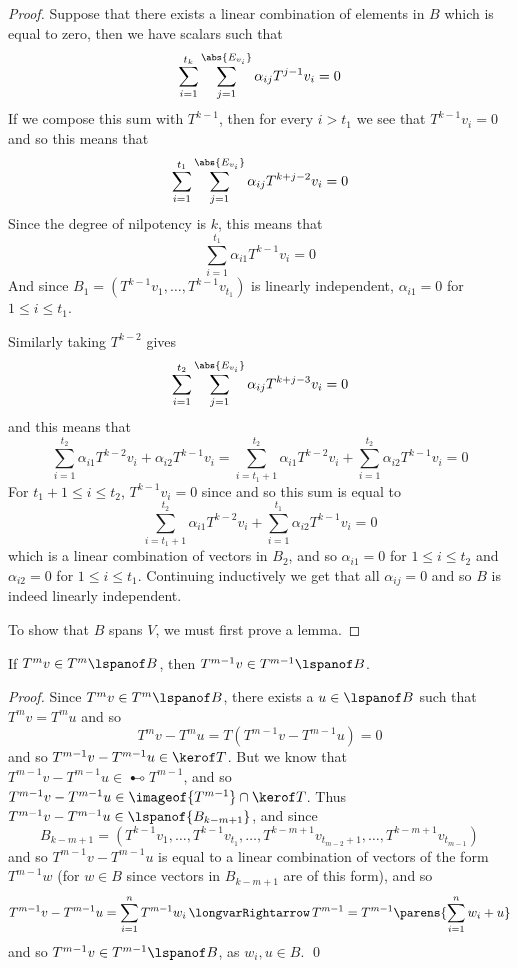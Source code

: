 \begin{proof}
    Suppose that there exists a linear combination of elements in $B$ which is equal to zero, then we have scalars such that
    \[ \sum_{i=1}^{t_k}\sum_{j=1}^{\abs{E_{v_i}}}\alpha_{ij}T^{j-1}v_i = 0 \]
    If we compose this sum with $T^{k-1}$, then for every $i>t_1$ we see that $T^{k-1}v_i=0$ and so this means that
    \[ \sum_{i=1}^{t_1}\sum_{j=1}^{\abs{E_{v_i}}}\alpha_{ij}T^{k+j-2}v_i = 0 \]
    Since the degree of nilpotency is $k$, this means that
    \[ \sum_{i=1}^{t_1}\alpha_{i1}T^{k-1}v_i = 0 \]
    And since $B_1=(T^{k-1}v_1,\dots,T^{k-1}v_{t_1})$ is linearly independent, $\alpha_{i1}=0$ for $1\leq i\leq t_1$.

    Similarly taking $T^{k-2}$ gives
    \[ \sum_{i=1}^{t_2}\sum_{j=1}^{\abs{E_{v_i}}}\alpha_{ij}T^{k+j-3}v_i = 0 \]
    and this means that
    \[ \sum_{i=1}^{t_2}\alpha_{i1}T^{k-2}v_i + \alpha_{i2}T^{k-1}v_i = \sum_{i=t_1+1}^{t_2}\alpha_{i1}T^{k-2}v_i + \sum_{i=1}^{t_2}\alpha_{i2}T^{k-1}v_i = 0 \]
    For $t_1+1\leq i\leq t_2$, $T^{k-1}v_i=0$ since and so this sum is equal to
    \[ \sum_{i=t_1+1}^{t_2}\alpha_{i1}T^{k-2}v_i + \sum_{i=1}^{t_1}\alpha_{i2}T^{k-1}v_i = 0 \]
    which is a linear combination of vectors in $B_2$, and so $\alpha_{i1}=0$ for $1\leq i\leq t_2$ and $\alpha_{i2}=0$ for $1\leq i\leq t_1$.
    Continuing inductively we get that all $\alpha_{ij}=0$ and so $B$ is indeed linearly independent.

    To show that $B$ spans $V$, we must first prove a lemma.

\end{proof}

\begin{lemm*}

    If $T^mv\in T^m\lspanof B$, then $T^{m-1}v\in T^{m-1}\lspanof B$.

\end{lemm*}

\begin{proof}

    Since $T^mv\in T^m\lspanof B$, there exists a $u\in\lspanof B$ such that $T^mv=T^mu$ and so
    \[ T^mv-T^mu = T(T^{m-1}v-T^{m-1}u) = 0 \]
    and so $T^{m-1}v-T^{m-1}u\in\kerof T$.
    But we know that $T^{m-1}v-T^{m-1}u\in\imageof{T^{m-1}}$, and so $T^{m-1}v-T^{m-1}u\in\imageof{T^{m-1}}\cap\kerof T$.
    Thus $T^{m-1}v-T^{m-1}u\in\lspanof{B_{k-m+1}}$, and since
    \[ B_{k-m+1} = (T^{k-1}v_1,\dots,T^{k-1}v_{t_1},\dots,T^{k-m+1}v_{t_{m-2}+1},\dots,T^{k-m+1}v_{t_{m-1}}) \]
    and so $T^{m-1}v-T^{m-1}u$ is equal to a linear combination of vectors of the form $T^{m-1}w$ (for $w\in B$ since vectors in $B_{k-m+1}$ are of this form), and so
    \[ T^{m-1}v - T^{m-1}u = \sum_{i=1}^n T^{m-1}w_i \implies T^{m-1} = T^{m-1}\parens{\sum_{i=1}^n w_i + u} \]
    and so $T^{m-1}v\in T^{m-1}\lspanof B$, as $w_i,u\in B$.
    \qed

\end{proof}

